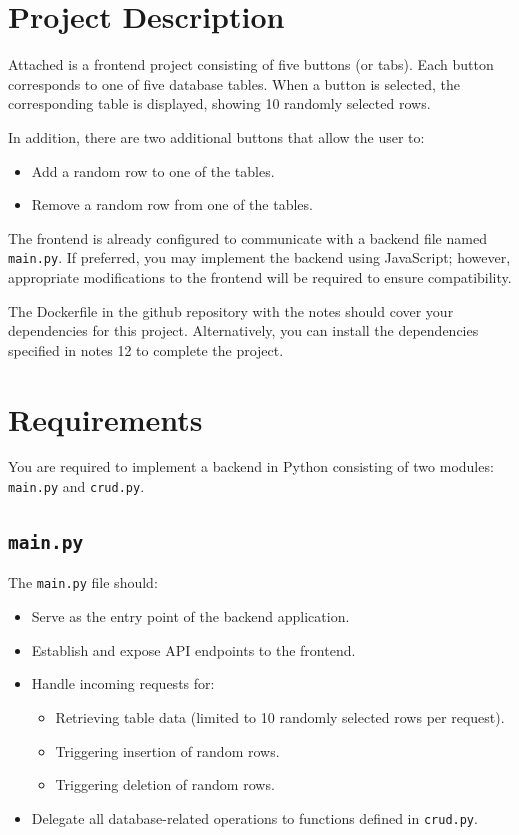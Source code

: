 \documentclass{article}
\begin{document}
\section*{Project Description}

Attached is a frontend project consisting of five buttons (or tabs). Each button corresponds to one of five database tables. When a button is selected, the corresponding table is displayed, showing 10 randomly selected rows.

In addition, there are two additional buttons that allow the user to:
\begin{itemize}
    \item Add a random row to one of the tables.
    \item Remove a random row from one of the tables.
\end{itemize}

The frontend is already configured to communicate with a backend file named \texttt{main.py}. If preferred, you may implement the backend using JavaScript; however, appropriate modifications to the frontend will be required to ensure compatibility.

The Dockerfile in the github repository with the notes should cover your dependencies for this project. Alternatively, you can install the dependencies specified in notes 12 to complete the project.

\section*{Requirements}

You are required to implement a backend in Python consisting of two modules: \texttt{main.py} and \texttt{crud.py}.

\subsection*{\texttt{main.py}}

The \texttt{main.py} file should:

\begin{itemize}
    \item Serve as the entry point of the backend application.
    \item Establish and expose API endpoints to the frontend.
    \item Handle incoming requests for:
    \begin{itemize}
        \item Retrieving table data (limited to 10 randomly selected rows per request).
        \item Triggering insertion of random rows.
        \item Triggering deletion of random rows.
    \end{itemize}
    \item Delegate all database-related operations to functions defined in \texttt{crud.py}.
\end{itemize}
\end{document}
